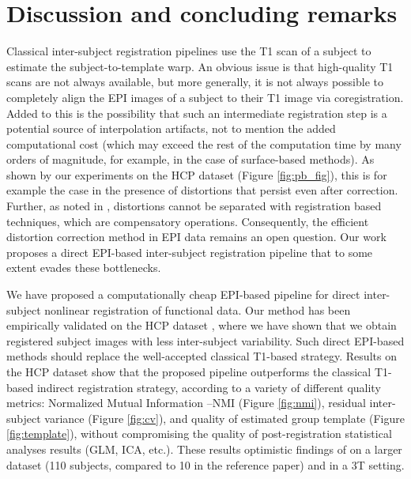 \section{Discussion and concluding remarks}
\label{sec:discussion}
Classical inter-subject registration pipelines use the T1 scan of a
subject to estimate the subject-to-template warp.
%
An obvious issue is that high-quality T1 scans are not always
available, but more generally, it is not always possible to completely
align the EPI images of a subject to their T1 image via
coregistration. Added to this is the possibility that such an intermediate registration step is
a potential source of interpolation artifacts, not to mention the added computational cost (which may exceed the rest of the computation time by many orders of magnitude, for example, in the case of surface-based methods). As shown by our experiments on the HCP dataset
\citep{VanEssen20122222} (Figure \ref{fig:pb_fig}), this is for example
the case in the presence of distortions
\citep{pmid9178246,pmid12270226,zeng2002,anderson2003} that persist
even after correction.  Further, as noted in \citep{pmid25405472},
distortions cannot be separated with registration based techniques,
which are compensatory operations. Consequently, the efficient
distortion correction method in EPI data remains an
open question. Our work proposes a direct EPI-based inter-subject
registration pipeline that to some extent evades these bottlenecks.

We have proposed a computationally cheap EPI-based pipeline for direct inter-subject nonlinear registration of functional data. Our method has been empirically validated on the HCP dataset \citep{VanEssen20122222}, where we have shown that we obtain registered subject images with less inter-subject variability. Such direct EPI-based methods should replace the well-accepted classical
T1-based strategy.
Results on the HCP dataset \citep{VanEssen20122222} show that the proposed pipeline outperforms the classical T1-based indirect registration strategy, according to a variety of different quality metrics: Normalized Mutual Information --NMI (Figure \ref{fig:nmi}), residual inter-subject
variance (Figure \ref{fig:cv}), and quality of estimated group template (Figure \ref{fig:template}), without compromising the quality of post-registration statistical analyses results (GLM, ICA, etc.).
These results optimistic findings of \citep{grabner2014} on a larger dataset (110 subjects, compared to 10 in the reference paper) and in a 3T setting.

